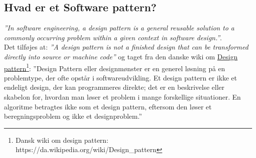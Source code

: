 \subsection{Hvad er et Software pattern?}
\textit{''In software engineering, a design pattern is a general reusable solution to a commonly occurring problem within a given context in software design.''}.\\

Det tilføjes at: 
\textit{''A design pattern is not a finished design that can be transformed directly into source or machine code''} og taget fra den danske wiki om \href{https://da.wikipedia.org/wiki/Design_pattern}{Design pattern\footnote{Dansk wiki om design pattern:  \url{https://da.wikipedia.org/wiki/Design_pattern}}}:
''Design Pattern eller designmønster er en generel løsning på en problemtype, der ofte opstår i softwareudvikling. Et design pattern er ikke et endeligt design, der kan programmeres direkte; det er en beskrivelse eller skabelon for, hvordan man løser et problem i mange forskellige situationer. En algoritme betragtes ikke som et design pattern, eftersom den løser et beregningsproblem og ikke et designproblem.''